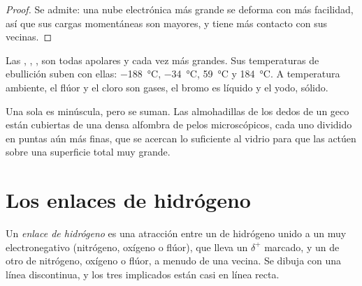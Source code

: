 \begin{proof}
Se admite: una nube electrónica más grande se deforma con más
facilidad, así que sus cargas momentáneas son mayores, y tiene más
contacto con sus vecinas.
\end{proof}

\begin{example}\label{ex:g11:polarity-and-cohesion:halogens}
Las  , , ,  son todas apolares y
cada vez más grandes. Sus temperaturas de ebullición suben con ellas:
\qty{-188}{\celsius}, \qty{-34}{\celsius}, \qty{59}{\celsius} y
\qty{184}{\celsius}. A temperatura ambiente, el flúor y el cloro son
gases, el bromo es líquido y el yodo, sólido.
\end{example}

\begin{remark}[El geco]\label{rem:g11:polarity-and-cohesion:gecko}
Una sola  es minúscula, pero se suman. Las
almohadillas de los dedos de un geco están cubiertas de una densa
alfombra de pelos microscópicos, cada uno dividido en puntas aún más
finas, que se acercan lo suficiente al vidrio para que las  actúen sobre una superficie total muy grande.
\end{remark}

\section{Los enlaces de hidrógeno}

\begin{definition}\label{def:g11:polarity-and-cohesion:hydrogen-bond}
Un \emph{enlace de hidrógeno} es una
atracción entre un  de hidrógeno unido a un  muy
electronegativo (nitrógeno, oxígeno o flúor), que lleva un $\delta^+$
marcado, y un  de otro  de nitrógeno, oxígeno o
flúor, a menudo de una  vecina. Se dibuja con una línea
discontinua, y los tres  implicados están casi en línea recta.
\end{definition}

